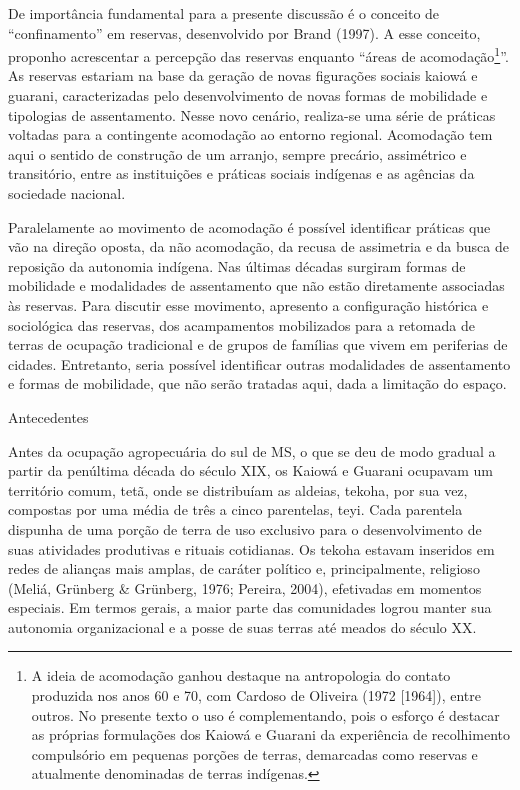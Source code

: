 \documentclass{article}
\begin{document}
De import\^ancia fundamental para a presente discuss\~ao \'e o conceito
de {\textquotedblleft}confinamento{\textquotedblright} em reservas,
desenvolvido por Brand (1997). A esse conceito, proponho acrescentar a
percep\c{c}\~ao das reservas enquanto {\textquotedblleft}\'areas de
acomoda\c{c}\~ao\footnote{ A ideia de acomoda\c{c}\~ao ganhou destaque
na antropologia do contato produzida nos anos 60 e 70, com Cardoso de
Oliveira (1972 [1964]), entre outros. No presente texto o uso \'e
complementando, pois o esfor\c{c}o \'e destacar as pr\'oprias
formula\c{c}\~oes dos Kaiow\'a e Guarani da experi\^encia de
recolhimento compuls\'orio em pequenas por\c{c}\~oes de terras,
demarcadas como reservas e atualmente denominadas de terras
ind\'igenas. }{\textquotedblright}. As reservas estariam na base da
gera\c{c}\~ao de novas figura\c{c}\~oes sociais kaiow\'a e guarani,
caracterizadas pelo desenvolvimento de novas formas de mobilidade e
tipologias de assentamento. Nesse novo cen\'ario, realiza-se uma
s\'erie de pr\'aticas voltadas para a contingente acomoda\c{c}\~ao ao
entorno regional. Acomoda\c{c}\~ao tem aqui o sentido de
constru\c{c}\~ao de um arranjo, sempre prec\'ario, assim\'etrico e
transit\'orio, entre as institui\c{c}\~oes e pr\'aticas sociais
ind\'igenas e as ag\^encias da sociedade nacional.

Paralelamente ao movimento de acomoda\c{c}\~ao \'e poss\'ivel
identificar pr\'aticas que v\~ao na dire\c{c}\~ao oposta, da n\~ao
acomoda\c{c}\~ao, da recusa de assimetria e da busca de reposi\c{c}\~ao
da autonomia ind\'igena. Nas \'ultimas d\'ecadas surgiram formas de
mobilidade e modalidades de assentamento que n\~ao est\~ao diretamente
associadas \`as reservas. Para discutir esse movimento, apresento a
configura\c{c}\~ao hist\'orica e sociol\'ogica das reservas, dos
acampamentos mobilizados para a retomada de terras de ocupa\c{c}\~ao
tradicional e de grupos de fam\'ilias que vivem em periferias de
cidades. Entretanto, seria poss\'ivel identificar outras modalidades de
assentamento e formas de mobilidade, que n\~ao ser\~ao tratadas aqui,
dada a limita\c{c}\~ao do espa\c{c}o. 

Antecedentes

Antes da ocupa\c{c}\~ao agropecu\'aria do sul de MS, o que se deu de
modo gradual a partir da pen\'ultima d\'ecada do s\'eculo XIX, os
Kaiow\'a e Guarani ocupavam um territ\'orio comum, tet\~a, onde se
distribu\'iam as aldeias, tekoha, por sua vez, compostas por uma
m\'edia de tr\^es a cinco parentelas, te{\textasciiacute}yi. Cada
parentela dispunha de uma por\c{c}\~ao de terra de uso exclusivo para o
desenvolvimento de suas atividades produtivas e rituais cotidianas. Os
tekoha estavam inseridos em redes de alian\c{c}as mais amplas, de
car\'ater pol\'itico e, principalmente, religioso (Meli\'a, Gr\"unberg
\& Gr\"unberg, 1976; Pereira, 2004), efetivadas em momentos especiais.
Em termos gerais, a maior parte das comunidades logrou manter sua
autonomia organizacional e a posse de suas terras at\'e meados do
s\'eculo XX.
\end{document}
